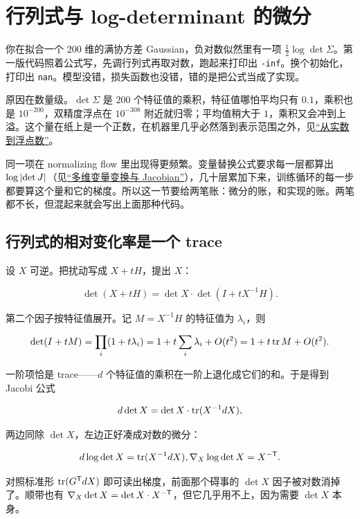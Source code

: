 \section{行列式与 log-determinant 的微分}
\label{sec:10-Matrix-Calculus/03-Trace-Calculus/03}

你在拟合一个 \(200\) 维的满协方差 Gaussian，负对数似然里有一项 \(\tfrac12\log\det\Sigma\)。第一版代码照着公式写，先调行列式再取对数，跑起来打印出 \texttt{-inf}。换个初始化，打印出 \texttt{nan}。模型没错，损失函数也没错，错的是把公式当成了实现。

原因在数量级。\(\det\Sigma\) 是 \(200\) 个特征值的乘积，特征值哪怕平均只有 \(0.1\)，乘积也是 \(10^{-200}\)，双精度浮点在 \(10^{-308}\) 附近就归零；平均值稍大于 \(1\)，乘积又会冲到上溢。这个量在纸上是一个正数，在机器里几乎必然落到表示范围之外，见\hyperref[sec:08-Numerical-Analysis/01-Floating-Point-and-Error/01]{``从实数到浮点数''}。

同一项在 normalizing flow 里出现得更频繁。变量替换公式要求每一层都算出 \(\log\left|\det J\right|\)（见\hyperref[sec:05-Probability/05-Joint-Distributions/05]{``多维变量变换与 Jacobian''}），几十层累加下来，训练循环的每一步都要算这个量和它的梯度。所以这一节要给两笔账：微分的账，和实现的账。两笔都不长，但混起来就会写出上面那种代码。

\subsection{行列式的相对变化率是一个 trace}

设 \(X\) 可逆。把扰动写成 \(X+tH\)，提出 \(X\)：

\[
\det(X+tH)=\det X\cdot\det(I+tX^{-1}H).
\]

第二个因子按特征值展开。记 \(M=X^{-1}H\) 的特征值为 \(\lambda_i\)，则

\[
\det(I+tM)=\prod_i(1+t\lambda_i)=1+t\sum_i\lambda_i+O(t^2)=1+t\operatorname{tr} M+O(t^2).
\]

一阶项恰是 trace——\(d\) 个特征值的乘积在一阶上退化成它们的和。于是得到 Jacobi 公式

\[
d\det X=\det X\cdot\operatorname{tr}(X^{-1}dX),
\]

两边同除 \(\det X\)，左边正好凑成对数的微分：

\[
d\log\det X=\operatorname{tr}(X^{-1}dX),
\space
\nabla_X\log\det X=X^{-\mathsf{T}}.
\]

对照标准形 \(\operatorname{tr}(G^{\mathsf{T}}dX)\) 即可读出梯度，前面那个碍事的 \(\det X\) 因子被对数消掉了。顺带也有 \(\nabla_X\det X=\det X\cdot X^{-\mathsf{T}}\)，但它几乎用不上，因为需要 \(\det X\) 本身。


